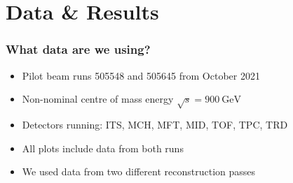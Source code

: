 \documentclass[10pt]{beamer}
\begin{document}
\section{Data \& Results}

\begin{frame}
    \frametitle{What data are we using?}

    \begin{itemize}
        \item Pilot beam runs 505548 and 505645 from October 2021
        \item Non-nominal centre of mass energy $\sqrt{s}=\SI{900}{\giga\electronvolt}$
        \item Detectors running: ITS, MCH, MFT, MID, TOF, TPC, TRD
        \item All plots include data from both runs
        \item We used data from two different reconstruction passes
    \end{itemize}

\end{frame}
\end{document}
